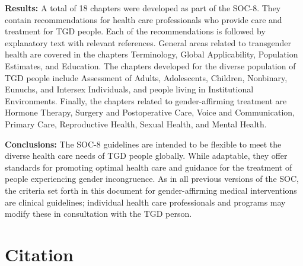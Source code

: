 \documentclass[
]{book}
\begin{document}
\textbf{Results:} A total of 18 chapters were developed as part of the SOC-8. They contain
recommendations for health care professionals who provide care and treatment for TGD
people. Each of the recommendations is followed by explanatory text with relevant references.
General areas related to transgender health are covered in the chapters Terminology, Global
Applicability, Population Estimates, and Education. The chapters developed for the diverse
population of TGD people include Assessment of Adults, Adolescents, Children, Nonbinary,
Eunuchs, and Intersex Individuals, and people living in Institutional Environments. Finally,
the chapters related to gender-affirming treatment are Hormone Therapy, Surgery and
Postoperative Care, Voice and Communication, Primary Care, Reproductive Health, Sexual
Health, and Mental Health.

\textbf{Conclusions:} The SOC-8 guidelines are intended to be flexible to meet the diverse health
care needs of TGD people globally. While adaptable, they offer standards for promoting
optimal health care and guidance for the treatment of people experiencing gender
incongruence. As in all previous versions of the SOC, the criteria set forth in this document
for gender-affirming medical interventions are clinical guidelines; individual health care
professionals and programs may modify these in consultation with the TGD person.

\hypertarget{citation}{%
\section*{Citation}\label{citation}}
\end{document}
